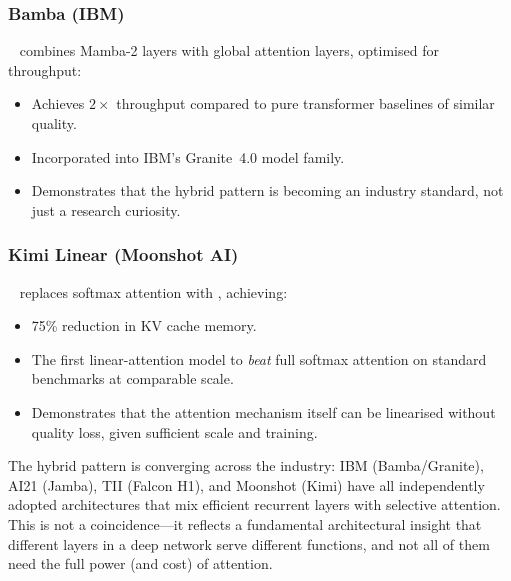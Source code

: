 \subsubsection{Bamba (IBM)}

~\cite{ibm2025bamba} combines Mamba-2 layers with
global attention layers, optimised for throughput:

\begin{itemize}[leftmargin=2em]
  \item Achieves $2\times$ throughput compared to pure transformer
    baselines of similar quality.
  \item Incorporated into IBM's Granite~4.0 model family.
  \item Demonstrates that the hybrid pattern is becoming an industry
    standard, not just a research curiosity.
\end{itemize}

\subsubsection{Kimi Linear (Moonshot AI)}

~\cite{kimi2025linear} replaces softmax attention
with , achieving:

\begin{itemize}[leftmargin=2em]
  \item 75\% reduction in KV cache memory.
  \item The first linear-attention model to \emph{beat} full
    softmax attention on standard benchmarks at comparable scale.
  \item Demonstrates that the attention mechanism itself can be
    linearised without quality loss, given sufficient scale and
    training.
\end{itemize}

\begin{engineernote}
The hybrid pattern is converging across the industry: IBM (Bamba/Granite),
AI21 (Jamba), TII (Falcon H1), and Moonshot (Kimi) have all
independently adopted architectures that mix efficient recurrent
layers with selective attention. This is not a coincidence---it
reflects a fundamental architectural insight that different layers in
a deep network serve different functions, and not all of them need
the full power (and cost) of attention.
\end{engineernote}

